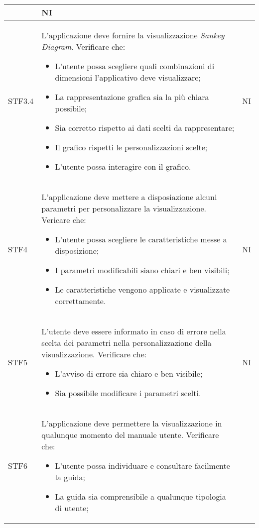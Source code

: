 \begin{center}
\begin{longtable}{|p{1.5cm}|p{11cm}|p{1cm}|}
\begin{itemize}
        \end{itemize} & NI\\ \hline
        \rowcolor[HTML]{EFEFEF}
        STF3.4 & L'applicazione deve fornire la visualizzazione  \textit{Sankey Diagram}. Verificare che: \begin{itemize}
            \item L'utente possa scegliere quali combinazioni di dimensioni l'applicativo deve visualizzare;
            \item La rappresentazione grafica sia la più chiara possibile;
            \item Sia corretto rispetto ai dati scelti da rappresentare;
            \item Il grafico rispetti le personalizzazioni scelte;
            \item L'utente possa interagire con il grafico.
        \end{itemize} & NI\\ \hline
        \rowcolor[HTML]{C0C0C0}
        STF4 & L'applicazione deve mettere a disposiazione alcuni parametri per personalizzare la visualizzazione. Vericare che: \begin{itemize}
            \item L'utente possa scegliere le caratteristiche messe a disposizione;
            \item I parametri modificabili siano chiari e ben visibili;
            \item Le caratteristiche vengono applicate e visualizzate correttamente.
        \end{itemize} & NI\\ \hline
        \rowcolor[HTML]{EFEFEF}
        STF5 & L'utente deve essere informato in caso di errore nella scelta dei parametri nella personalizzazione della visualizzazione. Verificare che: \begin{itemize}
            \item L'avviso di errore sia chiaro e ben visibile;
            \item Sia possibile modificare i parametri scelti.
        \end{itemize} & NI\\ \hline
        \rowcolor[HTML]{C0C0C0}
        STF6 & L'applicazione deve permettere la visualizzazione in qualunque momento del manuale utente. Verificare che: \begin{itemize}
            \item L'utente possa individuare e consultare facilmente la guida;
            \item La guida sia comprensibile a qualunque tipologia di utente;

\end{itemize}
\end{longtable}
\end{center}

